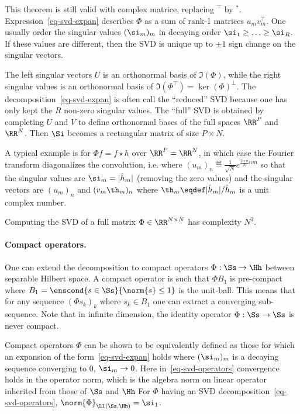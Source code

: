 This theorem is still valid with complex matrice, replacing $^\top$ by $^*$.
%
Expression~\eqref{eq-svd-expan} describes $\Phi$ as a sum of rank-1 matrices $u_m v_m^\top$.
%
One usually order the singular values $(\si_m)_m$ in decaying order $\si_1 \geq \ldots \geq \si_R$. If these values are different, then the SVD is unique up to $\pm 1$ sign change on the singular vectors.  

The left singular vectors $U$ is an orthonormal basis of $\Im(\Phi)$, while the right singular values is an orthonormal basis of $\Im(\Phi^\top)=\ker(\Phi)^\bot$.
%
The decomposition~\eqref{eq-svd-expan} is often call the ``reduced'' SVD because one has only kept the $R$ non-zero singular values.
The ``full'' SVD is obtained by completing $U$ and $V$ to define orthonormal bases of the full spaces $\RR^P$ and $\RR^N$. Then $\Si$ becomes a rectangular matrix of size $P\times N$.

A typical example is for $\Phi f=f \star h$ over $\RR^P=\RR^N$, in which case the Fourier transform diagonalizes the convolution, i.e.
where $(u_m)_n \eqdef \frac{1}{\sqrt{N}}e^{\frac{2\imath\pi}{N}nm}$ so that the singular values are $\si_m=|\hat h_m|$ (removing the zero values) and the singular vectors are $(u_m)_n$ and $(v_m \th_m)_n$ where $\th_m \eqdef |\hat h_m|/\hat h_m$ is a unit complex number. 

Computing the SVD of a full matrix $\Phi \in \RR^{N \times N}$ has complexity $N^3$. 

\paragraph{Compact operators.}

One can extend the decomposition to compact operators $\Phi : \Ss \rightarrow \Hh$ between separable Hilbert space. A compact operator is such that $\Phi B_1$ is pre-compact where $B_1=\enscond{s \in \Ss}{\norm{s}\leq 1}$ is the unit-ball. This means that for any sequence $(\Phi s_k)_k$ where $s_k \in B_1$ one can extract a converging sub-sequence. Note that in infinite dimension, the identity operator $\Phi : \Ss \rightarrow \Ss$ is never compact.

Compact operators $\Phi$ can be shown to be equivalently defined as those for which an expansion of the form~\eqref{eq-svd-expan} holds
where $(\si_m)_m$ is a decaying sequence converging to $0$, $\si_m \rightarrow 0$.
%
Here in~\eqref{eq-svd-operators} convergence holds in the operator norm, which is the algebra norm on linear operator inherited from those of $\Ss$ and $\Hh$
For $\Phi$ having an SVD decomposition~\eqref{eq-svd-operators}, $\norm{\Phi}_{\Ll(\Ss,\Hh)}=\si_1$.

